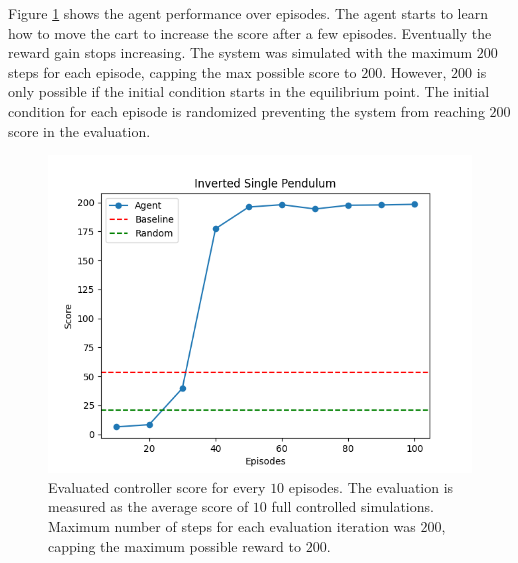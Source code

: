 \documentclass[final]{LTHtwocol} %
\begin{document}
Figure \ref{fig:single_pendulum_eval} shows the agent performance over episodes.
The agent starts to learn how to move the cart to increase the score after a few episodes.
Eventually the reward gain stops increasing.
The system was simulated with the maximum $200$ steps for each episode, capping the max possible score to $200$.
However, $200$ is only possible if the initial condition starts in the equilibrium point.
The initial condition for each episode is randomized preventing the system from reaching $200$ score in the evaluation.

\begin{figure}[htp]
	\centering
	\includegraphics[width=0.9\columnwidth]{figures/SinglePendulum_evaluation_score.png}
	\caption{Evaluated controller score for every $10$ episodes. The evaluation is measured as the average score of $10$ full controlled simulations. Maximum number of steps for each evaluation iteration was $200$, capping the maximum possible reward to $200$.}
	\label{fig:single_pendulum_eval}
\end{figure}

%
\end{document}
